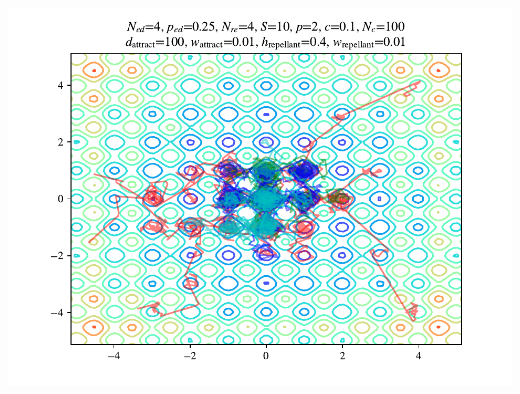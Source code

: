 \documentclass{beamer}
\begin{document}
\begin{frame}
\begin{columns}[T]
\begin{center}
    \includegraphics[scale=0.3]{assets/rastrigin_colony_ed_0_theta}
  \end{center}
\end{columns}
\end{frame}
\end{document}
